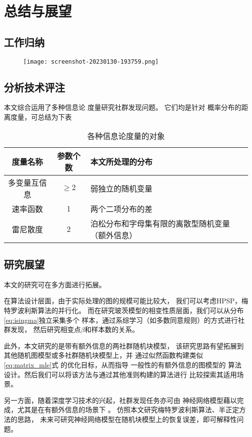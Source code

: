 \chapter{总结与展望}
\section{工作归纳}

\begin{figure}[!ht]
    \texttt{[image: screenshot-20230130-193759.png]}
\end{figure}

\section{分析技术评注}
本文综合运用了多种信息论
度量研究社群发现问题。
它们均是针对
概率分布的距离度量，可总结为下表
\begin{table}[!ht]
    \centering
  \begin{tabular}{ccp{5cm}}
    \hline
     度量名称    &   参数个数 &   本文所处理的分布 \\
    \hline
     多变量互信息 &    $\geq 2$ &    弱独立的随机变量  \\
     速率函数     &    1 &     两个二项分布的差  \\
     雷尼散度     &    2 &    泊松分布和字母集有限的离散型随机变量（额外信息） \\
    \hline
  \end{tabular}
  \caption{各种信息论度量的对象}\label{tab:info_metric}
\end{table}
  
\section{研究展望}
本文的研究可在多方面进行拓展。

在算法设计层面，由于实际处理的图的规模可能比较大，
我们可以考虑HPSP，梅特罗波利斯算法的并行化。
而在研究玻茨模型的相变性质层面，我们可以从分布
\eqref{eq:isingma}独立采集多个
样本，通过系综学习（如多数同意规则）的方式进行社群发现，
然后研究相变点$\beta$和样本数的关系。

此外，本文研究的是带有额外信息的两社群随机块模型，
该研究思路有望拓展到其他随机图模型或多社群随机块模型上，并
通过似然函数构建类似\eqref{eq:matrix_mle}式
的优化目标，从而指导
一般性的有额外信息的图模型的
算法设计。然后我们可以将该方法与通过其他准则\cite{chunaev2020community}构建的算法进行
比较探索其适用场景。

另一方面，随着深度学习技术的兴起，社群发现任务亦可由
神经网络模型藉以完成，尤其是在有额外信息的场景下 \cite{cao2018incorporating}。
仿照本文研究梅特罗波利斯算法、半正定方法的思路，
未来可研究神经网络模型在随机块模型上的恢复误差，即可解释性问题。